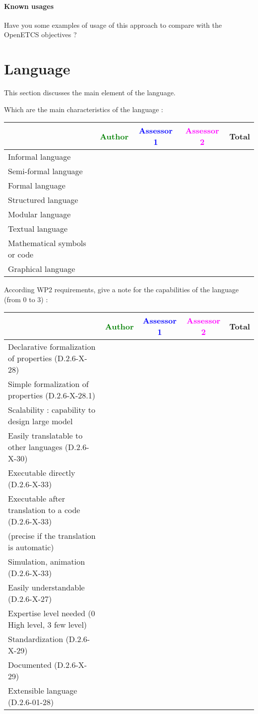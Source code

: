 \paragraph{Known usages} Have you some examples of usage of this approach to  compare with the OpenETCS objectives ?

\section{Language}
This section discusses the main element of the language.

Which are the main characteristics of the language :

\begin{tabular}{|l | c | c | c | c|}
\hline
& \textcolor{green}{Author} & \textcolor{blue}{Assessor 1} & \textcolor{magenta}{Assessor 2} & Total \\
\hline 
Informal language & & & &  \\
\hline 
Semi-formal language & & & &  \\
\hline
Formal language & & & &  \\
\hline
Structured language & & & & \\
\hline
Modular language & & & & \\
\hline
Textual language & & & & \\
\hline
Mathematical symbols or code & & & & \\
\hline
Graphical language & & & & \\
\hline
\end{tabular}

According WP2 requirements, give a note for the capabilities of the language (from 0 to 3) :

\begin{tabular}{|l | c | c | c | c|}
\hline
& \textcolor{green}{Author} & \textcolor{blue}{Assessor 1} & \textcolor{magenta}{Assessor 2} & Total \\
\hline
Declarative formalization of properties (D.2.6-X-28) & & & & \\
\hline
Simple formalization of properties (D.2.6-X-28.1) & & & & \\
\hline
Scalability : capability to design large model & & & & \\
\hline
Easily translatable to other languages (D.2.6-X-30) & & & & \\
\hline
Executable directly (D.2.6-X-33) & & & & \\
\hline
Executable after translation to a code (D.2.6-X-33) & & & & \\
(precise if the translation is automatic) & & & & \\
\hline
Simulation, animation (D.2.6-X-33) & & & & \\
\hline
Easily understandable (D.2.6-X-27) & & & & \\
\hline
Expertise level needed (0 High level, 3 few level) & & & & \\
\hline
Standardization (D.2.6-X-29) & & & & \\
\hline
Documented (D.2.6-X-29) & & & & \\
\hline
Extensible language (D.2.6-01-28) & & & & \\
\hline
\end{tabular}


